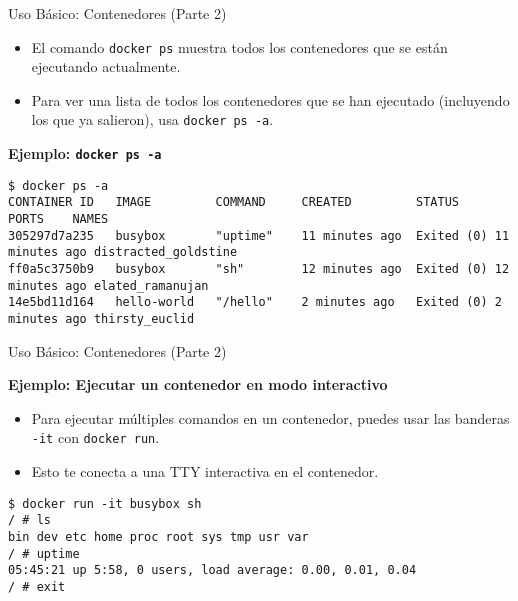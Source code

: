 \documentclass[aspectratio=169]{beamer} %
\begin{document}
\begin{frame}[containsverbatim]{Uso Básico: Contenedores (Parte 2)}
    \begin{itemize}
        \item El comando \texttt{docker ps} muestra todos los contenedores que se están ejecutando actualmente.
        \item Para ver una lista de todos los contenedores que se han ejecutado (incluyendo los que ya salieron), usa \texttt{docker ps -a}.
    \end{itemize}
    \vspace{0.5cm}
    \textbf{Ejemplo: \texttt{docker ps -a}}
    \begin{verbatim}
$ docker ps -a
CONTAINER ID   IMAGE         COMMAND     CREATED         STATUS                 PORTS    NAMES
305297d7a235   busybox       "uptime"    11 minutes ago  Exited (0) 11 minutes ago distracted_goldstine
ff0a5c3750b9   busybox       "sh"        12 minutes ago  Exited (0) 12 minutes ago elated_ramanujan
14e5bd11d164   hello-world   "/hello"    2 minutes ago   Exited (0) 2 minutes ago thirsty_euclid
    \end{verbatim}
\end{frame}
\begin{frame}[containsverbatim]{Uso Básico: Contenedores (Parte 2)}

    \textbf{Ejemplo: Ejecutar un contenedor en modo interactivo}
    \begin{itemize}
        \item Para ejecutar múltiples comandos en un contenedor, puedes usar las banderas \texttt{-it} con \texttt{docker run}.
        \item Esto te conecta a una TTY interactiva en el contenedor.
    \end{itemize}
    \begin{verbatim}
$ docker run -it busybox sh
/ # ls
bin dev etc home proc root sys tmp usr var
/ # uptime
05:45:21 up 5:58, 0 users, load average: 0.00, 0.01, 0.04
/ # exit
    \end{verbatim}
\end{frame}
\end{document}
